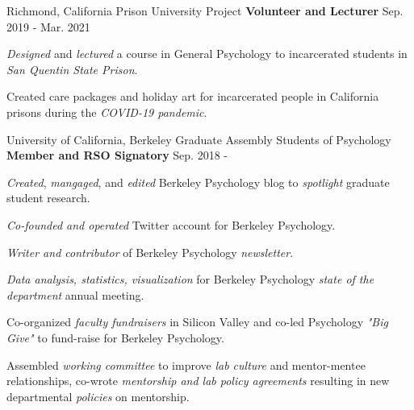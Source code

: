 

\begin{cventries}
    
  \cventry
    {Richmond, California} %
    {Prison University Project}
    {\textbf{Volunteer and Lecturer}} %
    {Sep. 2019 - Mar. 2021} %
    {
      \begin{cvitems} %
        \item {\textit{Designed} and \textit{lectured} a course in General Psychology to incarcerated students in \textit{San Quentin State Prison}.}
        \item {Created care packages and holiday art for incarcerated people in California prisons during the \textit{COVID-19 pandemic}.}
      \end{cvitems}
    }
    
  \cventry 
    {University of California, Berkeley} %
    {Graduate Assembly Students of Psychology}
    {\textbf{Member and RSO Signatory}} %
    {Sep. 2018 - } %
    {
      \begin{cvitems} %
        \item {\textit{Created}, \textit{mangaged}, and \textit{edited} Berkeley Psychology blog to \textit{spotlight} graduate student research.}
        \item {\textit{Co-founded and operated} Twitter account for Berkeley Psychology.}
        \item {\textit{Writer and contributor} of Berkeley Psychology \textit{newsletter}.}
        \item {\textit{Data analysis, statistics, visualization} for Berkeley Psychology \textit{state of the department} annual meeting.}
        \item {Co-organized \textit{faculty fundraisers} in Silicon Valley and co-led Psychology \textit{"Big Give"} to fund-raise for Berkeley Psychology.}
        \item {Assembled \textit{working committee} to improve \textit{lab culture} and mentor-mentee relationships, co-wrote \textit{mentorship and lab policy agreements} resulting in new departmental \textit{policies} on mentorship.}
      \end{cvitems}
    }
    

\end{cventries}

